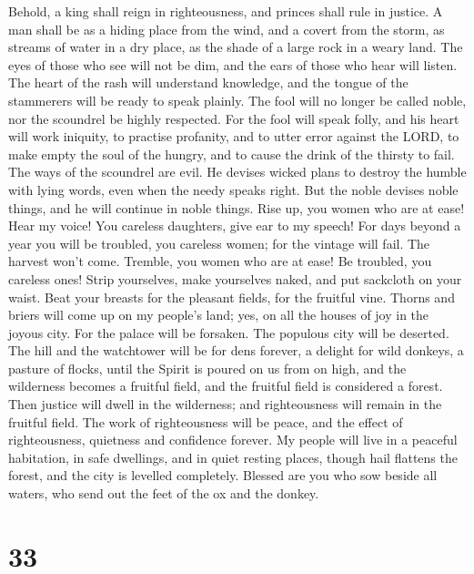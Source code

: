  Behold, a king shall reign in righteousness, and princes
shall rule in justice.  A man shall be as a hiding place
from the wind, and a covert from the storm, as streams of water in a dry
place, as the shade of a large rock in a weary land.  The
eyes of those who see will not be dim, and the ears of those who hear
will listen.  The heart of the rash will understand
knowledge, and the tongue of the stammerers will be ready to speak
plainly.  The fool will no longer be called noble, nor the
scoundrel be highly respected.  For the fool will speak
folly, and his heart will work iniquity, to practise profanity, and to
utter error against the LORD, to make empty the soul of the hungry, and
to cause the drink of the thirsty to fail.  The ways of the
scoundrel are evil. He devises wicked plans to destroy the humble with
lying words, even when the needy speaks right.  But the
noble devises noble things, and he will continue in noble things.
 Rise up, you women who are at ease! Hear my voice! You
careless daughters, give ear to my speech!  For days beyond
a year you will be troubled, you careless women; for the vintage will
fail. The harvest won't come.  Tremble, you women who are
at ease! Be troubled, you careless ones! Strip yourselves, make
yourselves naked, and put sackcloth on your waist.  Beat
your breasts for the pleasant fields, for the fruitful vine.
 Thorns and briers will come up on my people's land; yes,
on all the houses of joy in the joyous city.  For the
palace will be forsaken. The populous city will be deserted. The hill
and the watchtower will be for dens forever, a delight for wild donkeys,
a pasture of flocks,  until the Spirit is poured on us from
on high, and the wilderness becomes a fruitful field, and the fruitful
field is considered a forest.  Then justice will dwell in
the wilderness; and righteousness will remain in the fruitful field.
 The work of righteousness will be peace, and the effect of
righteousness, quietness and confidence forever.  My people
will live in a peaceful habitation, in safe dwellings, and in quiet
resting places,  though hail flattens the forest, and the
city is levelled completely.  Blessed are you who sow
beside all waters, who send out the feet of the ox and the donkey.

\hypertarget{section-32}{%
\section{33}\label{section-32}}

